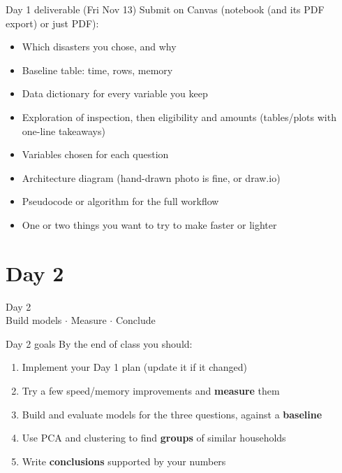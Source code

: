 \documentclass[aspectratio=43,11pt]{beamer}
\begin{document}
\begin{frame}{Day 1 deliverable (Fri Nov 13)}
  Submit on Canvas (notebook (and its PDF export) or just PDF):
  \vspace{0.5em}
  \begin{itemize}
    \item[$\square$] Which disasters you chose, and why
    \item[$\square$] Baseline table: time, rows, memory
    \item[$\square$] Data dictionary for every variable you keep
    \item[$\square$] Exploration of inspection, then eligibility and amounts
          (tables/plots with one-line takeaways)
    \item[$\square$] Variables chosen for each question
    \item[$\square$] Architecture diagram (hand-drawn photo is fine, or draw.io)
    \item[$\square$] Pseudocode or algorithm for the full workflow
    \item[$\square$] One or two things you want to try to make faster or lighter
  \end{itemize}
\end{frame}

\section{Day 2}

\begin{frame}
  \centering
  \Huge Day 2 \\[0.5em]
  \large Build models $\cdot$ Measure $\cdot$ Conclude
\end{frame}

\begin{frame}{Day 2 goals}
  By the end of class you should:
  \vspace{0.5em}
  \begin{enumerate}
    \item Implement your Day 1 plan (update it if it changed)
    \item Try a few speed/memory improvements and \textbf{measure} them
    \item Build and evaluate models for the three questions, against a
          \textbf{baseline}
    \item Use PCA and clustering to find \textbf{groups} of similar households
    \item Write \textbf{conclusions} supported by your numbers
  \end{enumerate}
\end{frame}
\end{document}
